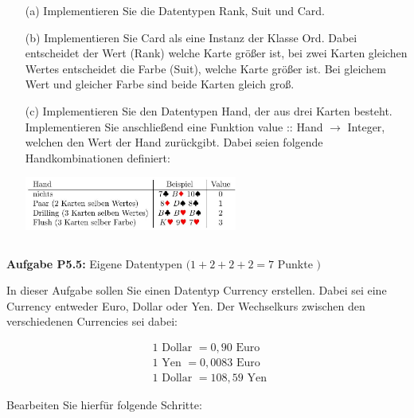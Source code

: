 \begin{itemize}
  \item [(a)] Implementieren Sie die Datentypen Rank, Suit und Card.

\item [(b)] Implementieren Sie Card als eine Instanz der Klasse Ord. Dabei entscheidet der Wert (Rank) welche Karte größer ist, bei zwei Karten gleichen Wertes entscheidet die Farbe (Suit), welche Karte größer ist. Bei gleichem Wert und gleicher Farbe sind beide Karten gleich groß. 

\item [(c)] Implementieren Sie den Datentypen Hand, der aus drei Karten besteht. Implementieren Sie anschließend eine Funktion value :: Hand $\rightarrow$ Integer, welchen den Wert der Hand zurückgibt. Dabei seien folgende Handkombinationen definiert:

\centering
\includegraphics[width=7cm]{2022_11_15_0a5a2eee0aef383b0ce9g-3}

\newpage

\inputminted{Haskell}{A5_4.hs}
\end{itemize}

\newpage

\textbf{Aufgabe P5.5:} Eigene Datentypen $(1+2+2+2=7$ Punkte $)$ 

In dieser Aufgabe sollen Sie einen Datentyp Currency erstellen. Dabei sei eine Currency entweder Euro, Dollar oder Yen. Der Wechselkurs zwischen den verschiedenen Currencies sei dabei:

$$
\begin{aligned}
&1 \text { Dollar }=0,90 \text { Euro } \\
&1 \text { Yen }=0,0083 \text { Euro } \\
&1 \text { Dollar }=108,59 \text { Yen }
\end{aligned}
$$

Bearbeiten Sie hierfür folgende Schritte:

